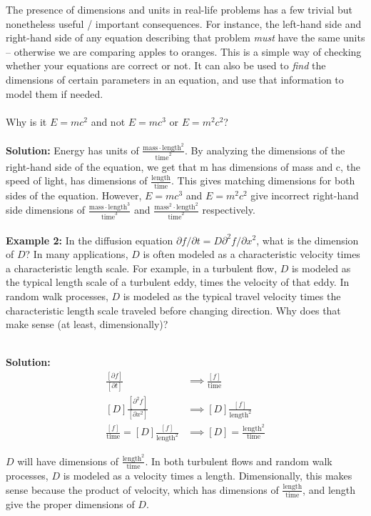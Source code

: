 The presence of dimensions and units in real-life problems has a few trivial but nonetheless useful / important consequences. For instance, the left-hand side and right-hand side of any equation describing that problem {\it must} have the same units -- otherwise we are comparing apples to oranges. This is a simple way of checking whether your equations are correct or not. It can also be used to {\it find} the dimensions of certain parameters in an equation, and use that information to model them if needed.  
\\
\\
 Why is it $E = mc^2$ and not $E = mc^3$ or $E = m^2c^2$?
\\
\\
{\color{red} {\bf Solution:}
Energy has units of $\frac{\text{mass} \cdot \text{length}^2}{\text{time}^2}$. By analyzing the dimensions of the right-hand side of the equation, we get that m has dimensions of mass and c, the speed of light, has dimensions of $\frac{\text{length}}{\text{time}}$. This gives matching dimensions for both sides of the equation. However, $E = mc^3$ and $E = m^2c^2$ give incorrect right-hand side dimensions of $\frac{\text{mass} \cdot \text{length}^3}{\text{time}^3}$ and $\frac{\text{mass}^2 \cdot \text{length}^2}{\text{time}^2}$ respectively.
}
\\
\\
{\bf Example 2:} 
In the diffusion equation $\partial f/\partial t = D \partial^2 f / \partial x^2$, what is the dimension of $D$? In many applications, $D$ is often modeled as a characteristic velocity times a characteristic length scale. For example, in a turbulent flow, $D$ is modeled as the typical length scale of a turbulent eddy, times the velocity of that eddy. In random walk processes, $D$ is modeled as the  typical travel velocity times the characteristic length scale traveled before changing direction. Why does that make sense (at least, dimensionally)? \\
\\
{\color{red} {\bf Solution:}
\begin{align*}
    \frac{[\partial f]}{[\partial t]} &\implies \frac{[f]}{\text{time}}\\
    [D] \frac{[\partial ^2 f]}{[\partial x^2]} &\implies [D] \frac{[f]}{\text{length}^2}\\
    \frac{[f]}{\text{time}} = [D] \frac{[f]}{\text{length}^2} &\implies [D] = \frac{\text{length}^2}{\text{time}}
\end{align*}

\noindent $D$ will have dimensions of $\frac{\text{length}^2}{\text{time}}$. In both turbulent flows and random walk processes, $D$ is modeled as a velocity times a length. Dimensionally, this makes sense because the product of velocity, which has dimensions of $\frac{\text{length}}{\text{time}}$, and length give the proper dimensions of $D$.
}

